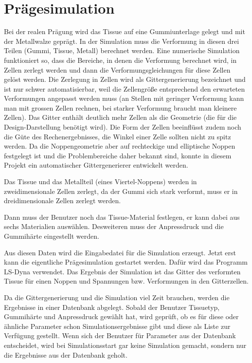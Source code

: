 \section{Pr\"agesimulation}
Bei der realen Pr\"agung wird das Tissue auf eine Gummiunterlage gelegt
und mit der Metallwalze gepr\"agt. In der Simulation muss die Verformung
in diesen drei Teilen (Gummi, Tissue, Metall) berechnet werden. 
Eine numerische Simulation funktioniert so, dass die Bereiche, in denen 
die Verformung berechnet wird, in Zellen zerlegt werden und dann die 
Verformungsgleichungen f\"ur diese Zellen gel\"ost werden. Die Zerlegung
in Zellen wird als Gittergenerierung bezeichnet und ist nur schwer
automatisierbar, weil die Zellengr\"o\ss e entsprechend den erwarteten
Verformungen angepasst werden muss (an Stellen mit geringer Verformung kann
man mit grossen Zellen rechnen, bei starker Verformung braucht man
kleinere Zellen). Das Gitter enth\"alt deutlich mehr Zellen als die
Geometrie (die f\"ur die Design-Darstellung ben\"otigt wird).
Die Form der Zellen beeinfl\"usst zudem noch die G\"ute
des Rechenergebnisses, die Winkel einer Zelle sollten nicht zu spitz
werden. Da die Noppengeometrie aber auf rechteckige und elliptische
Noppen festgelegt ist und die Problembereiche daher bekannt sind, konnte 
in diesem Projekt ein automatischer Gittergenerierer entwickelt werden.

Das Tissue und das Metallteil (eines Viertel-Noppens) werden in 
zweidimensionale Zellen zerlegt, da der Gummi sich stark verformt, 
muss er in dreidimensionale Zellen zerlegt werden.

Dann muss der Benutzer noch das Tissue-Material festlegen, er kann dabei aus
sechs Materialien ausw\"ahlen. Desweiteren muss der Anpressdruck und die
Gummih\"arte eingestellt werden.

Aus diesen Daten wird die Eingabedatei f\"ur die Simulation erzeugt. 
Jetzt erst kann die eigentliche Pr\"agesimulation gestartet werden. Daf\"ur
wird das Programm LS-Dyna verwendet. Das Ergebnis der Simulation ist das
Gitter des verformten Tissue f\"ur einen Noppen und Spannungen bzw. 
Verformungen in den Gitterzellen.

Da die Gittergenerierung und die Simulation viel Zeit brauchen, werden
die Ergebnisse in einer Datenbank abgelegt. Sobald der Benutzer Tissuetyp,
Gummih\"arte und Anpressdruck gew\"ahlt hat, wird gepr\"uft, ob es f\"ur
diese oder \"ahnliche Parameter schon 
Simulationsergebnisse gibt und diese als Liste zur Verf\"ugung gestellt. Wenn
sich der Benutzer f\"ur Parameter aus der Datenbank entscheidet, wird
bei Simulationsstart gar keine Simulation gemacht, sondern nur die
Ergebnisse aus der Datenbank geholt.

